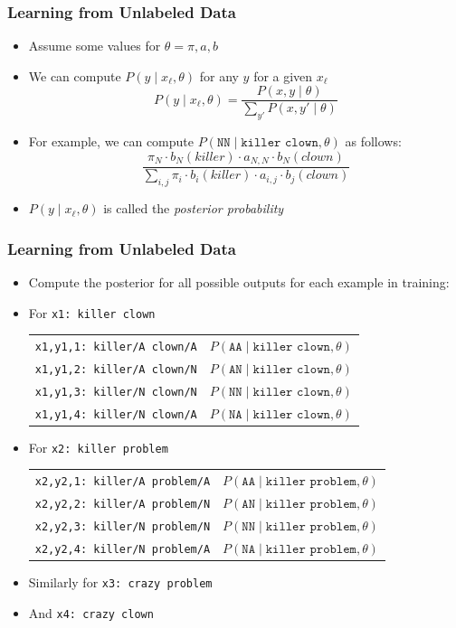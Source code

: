 \begin{frame}
\frametitle{Learning from Unlabeled Data}
\begin{itemize}[<+->]
\item Assume some values for $\theta = \pi, a, b$
\item We can compute $P(y \mid x_\ell, \theta)$ for any $y$ for a given $x_\ell$
\[ P(y \mid x_\ell, \theta) = \frac{ P(x, y \mid \theta) }{ \sum_{y'} P(x, y' \mid \theta) } \]
\item For example, we can compute $P( \texttt{NN} \mid \texttt{killer clown}, \theta)$ as follows:
\[ \frac{ \pi_N \cdot b_N(\textit{killer}) \cdot a_{N,N} \cdot b_N(\textit{clown}) }
{ \sum_{i,j} \pi_i \cdot b_i(\textit{killer}) \cdot a_{i,j} \cdot b_j(\textit{clown}) } \]
\item $P(y \mid x_\ell, \theta)$ is called the \emph{posterior probability}
\end{itemize}
\end{frame}

\begin{frame}
\frametitle{Learning from Unlabeled Data}
\begin{itemize}[<+->]
\item Compute the posterior for all possible outputs for each example in training:
\item For {\tt x1: killer clown} \pause
{\small\begin{tabular}{ll}
{\tt x1,y1,1: killer/A clown/A} & $P(\texttt{AA} \mid \texttt{killer clown}, \theta)$ \pause \\
{\tt x1,y1,2: killer/A clown/N} & $P(\texttt{AN} \mid \texttt{killer clown}, \theta)$ \pause \\
{\tt x1,y1,3: killer/N clown/N} & $P(\texttt{NN} \mid \texttt{killer clown}, \theta)$ \pause \\
{\tt x1,y1,4: killer/N clown/A} & $P(\texttt{NA} \mid \texttt{killer clown}, \theta)$
\end{tabular}}
\item For {\tt x2: killer problem}
{\small\begin{tabular}{ll}
{\tt x2,y2,1: killer/A problem/A} & $P(\texttt{AA} \mid \texttt{killer problem}, \theta)$ \\
{\tt x2,y2,2: killer/A problem/N} & $P(\texttt{AN} \mid \texttt{killer problem}, \theta)$\\
{\tt x2,y2,3: killer/N problem/N} & $P(\texttt{NN} \mid \texttt{killer problem}, \theta)$\\
{\tt x2,y2,4: killer/N problem/A} & $P(\texttt{NA} \mid \texttt{killer problem}, \theta)$
\end{tabular}}
\item Similarly for {\tt x3: crazy problem} 
\item And {\tt x4: crazy clown}
\end{itemize}
\end{frame}


